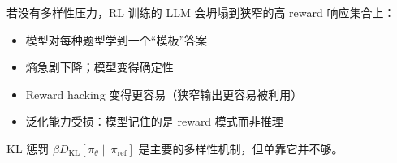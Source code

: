 \begin{intuitionbox}[RL 训练中的模式坍塌]
若没有多样性压力，RL 训练的 LLM 会坍塌到狭窄的高 reward 响应集合上：

\begin{itemize}
  \item 模型对每种题型学到一个“模板”答案
  \item 熵急剧下降；模型变得确定性
  \item Reward hacking 变得更容易（狭窄输出更容易被利用）
  \item 泛化能力受损：模型记住的是 reward 模式而非推理
\end{itemize}

KL 惩罚 $\beta D_\text{KL}[\pi_\theta \| \pi_\text{ref}]$ 是主要的多样性机制，但单靠它并不够。
\end{intuitionbox}

